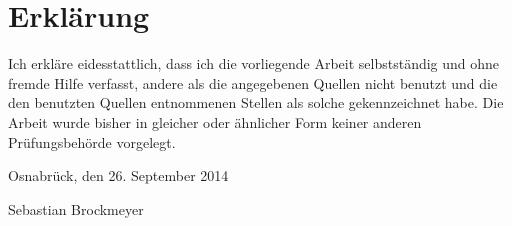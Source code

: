 \documentclass{scrreprt}
\begin{document}
\newpage



\chapter*{Erklärung}
\noindent
Ich erkläre eidesstattlich, dass ich die vorliegende Arbeit selbstständig und ohne fremde Hilfe verfasst, 
andere als die angegebenen Quellen nicht benutzt und die den benutzten Quellen entnommenen Stellen als 
solche gekennzeichnet habe. Die Arbeit wurde bisher in gleicher oder ähnlicher Form keiner anderen 
Prüfungsbehörde vorgelegt.
\par
\vspace{10mm}
\noindent
Osnabrück, den 26. September 2014
\par
\vspace{12mm}
\noindent
Sebastian Brockmeyer
\end{document}
